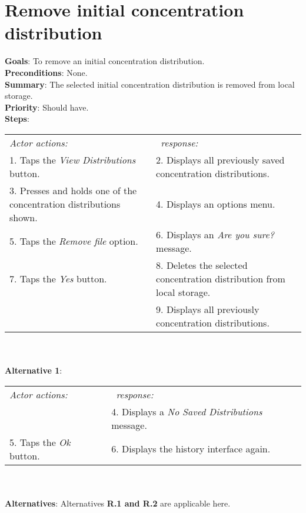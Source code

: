 \section{Remove initial concentration distribution}
 \label{removedist}
  \textbf{Goals}: To remove an initial concentration distribution.\\
  \textbf{Preconditions}: None.\\
  \textbf{Summary}: The selected initial concentration distribution is removed from local storage.\\
  \textbf{Priority}: Should have.\\
  \textbf{Steps}: \\
    \begin{tabular}{ p{} p{} }
  	\emph{Actor actions:} & \emph{\projectname\ response:} \\
    1. Taps the \emph{View Distributions} button. & 2. Displays all previously saved concentration distributions.\\
    3. Presses and holds one of the concentration distributions shown. & 4. Displays an options menu. \\
    5. Taps the \emph{Remove file} option. & 6. Displays an \emph{Are you sure?} message.\\
    7. Taps the \emph{Yes} button. & 8. Deletes the selected concentration distribution from local storage. \\
     & 9. Displays all previously concentration distributions.\\
    \end{tabular}
                \\
     \\\textbf{Alternative 1}: \\
    \begin{tabular}{ p{} p{} }
  	\emph{Actor actions:} & \emph{\projectname\ response:} \\
            & 4. Displays a \emph{No Saved Distributions} message. \\
    5. Taps the \emph{Ok} button. & 6. Displays the history interface again. \\
    \end{tabular}
    \\
    \\\textbf{Alternatives}: Alternatives \textbf{R.1 and R.2} are applicable here.

